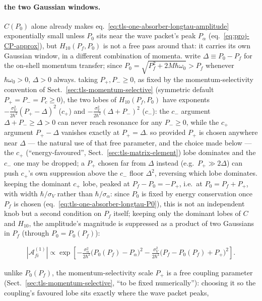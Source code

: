 \paragraph{the two Gaussian windows.} $C(P_0)$ alone already makes eq.~\eqref{eq:tls-one-absorber-longtau-amplitude} exponentially small unless $P_0$ sits near the wave packet's peak $P_\alpha$ (eq.~\eqref{eq:proj-CP-approx}), but $H_{10}(P_f,P_0)$ is not a free pass around that: it carries its own Gaussian window, in a different combination of momenta. write $\Delta\equiv P_0-P_f$ for the on-shell momentum transfer; since $P_0=\sqrt{P_f^2+2M\hbar\omega_0}>P_f$ whenever $\hbar\omega_0>0$, $\Delta>0$ always. taking $P_+,P_-\ge0$, as fixed by the momentum-selectivity convention of Sect.~\ref{sec:tls-momentum-selective} (symmetric default $P_+=P_-=P_c\ge0$), the two lobes of $H_{10}(P_f,P_0)$ have exponents $-\frac{\sigma_V^2}{2\hbar^2}(P_+-\Delta)^2$ ($c_+$) and $-\frac{\sigma_V^2}{2\hbar^2}(\Delta+P_-)^2$ ($c_-$): the $c_-$ argument $\Delta+P_-\ge\Delta>0$ can never reach resonance for any $P_-\ge0$, while the $c_+$ argument $P_+-\Delta$ vanishes exactly at $P_+=\Delta$. so provided $P_+$ is chosen anywhere near $\Delta$ --- the natural use of that free parameter, and the choice made below --- the $c_+$ (``energy-favoured'', Sect.~\ref{sec:tls-matrix-element}) lobe dominates and the $c_-$ one may be dropped; a $P_+$ chosen far from $\Delta$ instead (e.g.\ $P_+\gg2\Delta$) can push $c_+$'s own suppression above the $c_-$ floor $\Delta^2$, reversing which lobe dominates. keeping the dominant $c_+$ lobe, peaked at $P_f-P_0=-P_+$, i.e.\ at $P_0=P_f+P_+$, with width $\hbar/\sigma_V$ rather than $\hbar/\sigma_\alpha$: since $P_0$ is fixed by energy conservation once $P_f$ is chosen (eq.~\eqref{eq:tls-one-absorber-longtau-P0}), this is not an independent knob but a second condition on $P_f$ itself; keeping only the dominant lobes of $C$ and $H_{10}$, the amplitude's magnitude is suppressed as a product of two Gaussians in $P_f$ (through $P_0=P_0(P_f)$):
\begin{importantbox}
    \begin{align}
        \left|\mathcal A_{fi}^{(1)}\right| \propto \exp\left[-\frac{\sigma_\alpha^2}{2\hbar^2}\big(P_0(P_f)-P_\alpha\big)^2 - \frac{\sigma_V^2}{2\hbar^2}\big(P_f-P_0(P_f)+P_+\big)^2\right].\label{eq:tls-one-absorber-longtau-suppression}
    \end{align}
\end{importantbox}
unlike $P_0(P_f)$, the momentum-selectivity scale $P_+$ is a free coupling parameter (Sect.~\ref{sec:tls-momentum-selective}, ``to be fixed numerically''): choosing it so the coupling's favoured lobe sits exactly where the wave packet peaks,
